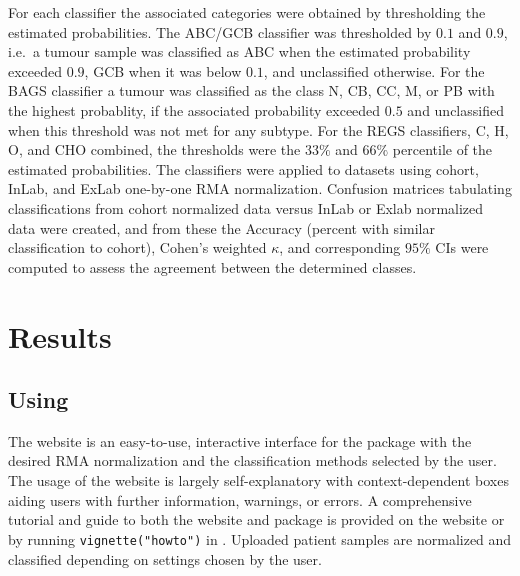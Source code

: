\documentclass{article}
\begin{document}
For each classifier the associated categories were obtained by thresholding the estimated probabilities.
The ABC/GCB classifier was thresholded by $0.1$ and $0.9$, i.e.\ a tumour sample was classified as ABC when the estimated probability exceeded $0.9$, GCB when it was below $0.1$, and unclassified otherwise.
For the BAGS classifier a tumour was classified as the class N, CB, CC, M, or PB with the highest probablity, if the associated probability exceeded $0.5$ and unclassified when this threshold was not met for any subtype.
For the REGS classifiers, C, H, O, and CHO combined, the thresholds were the $33\%$ and $66\%$ percentile of the estimated probabilities.
The classifiers were applied to datasets using cohort, InLab, and ExLab one-by-one RMA normalization.
Confusion matrices tabulating classifications from cohort normalized data versus InLab or Exlab normalized data were created, and from these the Accuracy (percent with similar classification to cohort), Cohen's weighted $\kappa$, and corresponding $95\%$ CIs were computed to assess the agreement between the determined classes.

\section{Results}
\subsection{Using \hemaClass{}}
The website is an easy-to-use, interactive interface for the  package with the desired RMA normalization and the classification methods selected by the user.
The usage of the website is largely self-explanatory with context-dependent boxes aiding users with further information, warnings, or errors.
A comprehensive tutorial and guide to both the website and package is provided on the website or by running \texttt{vignette("howto")} in \R{}. Uploaded patient samples are normalized and classified depending on settings chosen by the user.
\end{document}
